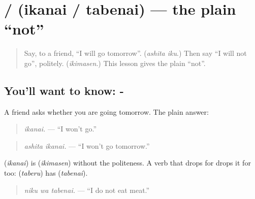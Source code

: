 \section[\texorpdfstring{\ja{いかない} / \ja{たべない} (ikanai / tabenai)}{いかない / たべない (ikanai / tabenai)}]{ /  (ikanai / tabenai) — the plain \textquotedblleft{}not\textquotedblright{}}

\label{lesson:JA-C251-ikanai}



\begin{quote}
Say, to a friend, \textquotedblleft{}I will go tomorrow\textquotedblright{}. (\emph{ashita iku}.) Then say \textquotedblleft{}I will not go\textquotedblright{}, politely. (\emph{ikimasen}.) This lesson gives the plain \textquotedblleft{}not\textquotedblright{}.
\end{quote}

\subsection*{You'll want to know: -}
A friend asks whether you are going tomorrow. The plain answer:

\begin{quote}
\textbf{}
\end{quote}

\begin{quote}
\emph{ikanai.} — \textquotedblleft{}I won't go.\textquotedblright{}
\end{quote}

\begin{quote}
\textbf{ }
\end{quote}

\begin{quote}
\emph{ashita ikanai.} — \textquotedblleft{}I won't go tomorrow.\textquotedblright{}
\end{quote}

\textbf{} (\emph{ikanai}) is \textbf{} (\emph{ikimasen}) without the politeness. A verb that drops \textbf{} for \textbf{} drops it for \textbf{} too: \textbf{} (\emph{taberu}) has \textbf{} (\emph{tabenai}).

\begin{quote}
\textbf{ }
\end{quote}

\begin{quote}
\emph{niku wa tabenai.} — \textquotedblleft{}I do not eat meat.\textquotedblright{}
\end{quote}


